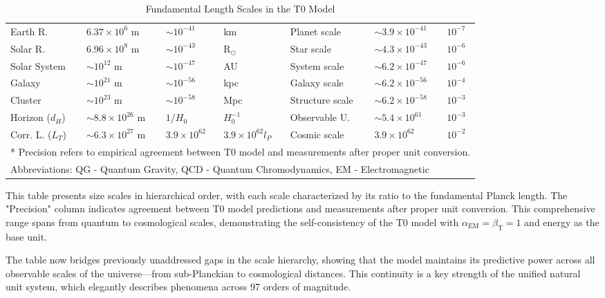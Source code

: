 \documentclass[12pt,a4paper]{article}
\newcommand{\alphaEM}{\alpha_{\text{EM}}}
\newcommand{\betaT}{\beta_{\text{T}}}
\begin{document}
\begin{table}[ht]
\begin{adjustbox}{scale=0.7}
\begin{tabular}{lllllll}
			Earth R. & $6.37 \times 10^{6}$ m & $\sim 10^{-41}$ & km & Planet scale & $\sim 3.9 \times 10^{-41}$ & $10^{-7}$ \\
			Solar R. & $6.96 \times 10^{8}$ m & $\sim 10^{-43}$ & R$_{\odot}$ & Star scale & $\sim 4.3 \times 10^{-43}$ & $10^{-6}$ \\
			Solar System & $\sim 10^{12}$ m & $\sim 10^{-47}$ & AU & System scale & $\sim 6.2 \times 10^{-47}$ & $10^{-6}$ \\
			Galaxy & $\sim 10^{21}$ m & $\sim 10^{-56}$ & kpc & Galaxy scale & $\sim 6.2 \times 10^{-56}$ & $10^{-4}$ \\
			Cluster & $\sim 10^{23}$ m & $\sim 10^{-58}$ & Mpc & Structure scale & $\sim 6.2 \times 10^{-58}$ & $10^{-3}$ \\
			Horizon ($d_H$) & $\sim 8.8 \times 10^{26}$ m & $1/H_0$ & $H_0^{-1}$ & Observable U. & $\sim 5.4 \times 10^{61}$ & $10^{-3}$ \\
			Corr. L. ($L_T$) & $\sim 6.3 \times 10^{27}$ m & $3.9 \times 10^{62}$ & $3.9 \times 10^{62} l_P$ & Cosmic scale & $3.9 \times 10^{62}$ & $10^{-2}$ \\
			\hline
			\multicolumn{7}{l}{* Precision refers to empirical agreement between T0 model and measurements after proper unit conversion.} \\
			\multicolumn{7}{l}{Abbreviations: QG - Quantum Gravity, QCD - Quantum Chromodynamics, EM - Electromagnetic} \\
			\hline
		\end{tabular}
	\end{adjustbox}
	\caption{Fundamental Length Scales in the T0 Model}
	\label{tab:length_scales}
\end{table}

This table presents size scales in hierarchical order, with each scale characterized by its ratio to the fundamental Planck length. The "Precision" column indicates agreement between T0 model predictions and measurements after proper unit conversion. This comprehensive range spans from quantum to cosmological scales, demonstrating the self-consistency of the T0 model with $\alphaEM = \betaT = 1$ and energy as the base unit.

The table now bridges previously unaddressed gaps in the scale hierarchy, showing that the model maintains its predictive power across all observable scales of the universe—from sub-Planckian to cosmological distances. This continuity is a key strength of the unified natural unit system, which elegantly describes phenomena across 97 orders of magnitude.
\end{document}
